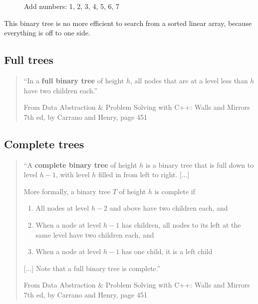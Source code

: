 \documentclass[a4paper,12pt,oneside]{book}
\begin{document}
{    \begin{figure}[h]
        \begin{center}
        \end{center}
        \caption{Add numbers: 1, 2, 3, 4, 5, 6, 7}
    \end{figure}

    This binary tree is no more efficient to search from a sorted linear array,
    because everything is off to one side.

    \subsection{Full trees}

    \begin{quote}
        ``In a \textbf{full binary tree} of height $h$, all nodes that are at a level less than $h$
        have two children each.''
        
        \footnotesize
        From Data Abstraction \& Problem Solving with C++: Walls and Mirrors 7th ed, by Carrano and Henry, page 451
    \end{quote}
    
    
    \subsection{Complete trees}
    
    \begin{quote}
        ``A \textbf{complete binary tree} of height $h$ is a binary tree that is full down to level $h-1$, with level $h$
        filled in from left to right. [...]

        More formally, a binary tree $T$ of height $h$ is complete if

        \begin{enumerate}
            \item   All nodes at level $h-2$ and above have two children each, and
            \item   When a node at level $h-1$ has children, all nodes to its left at the same level have two children each, and
            \item   When a node at level $h-1$ has one child, it is a left child
        \end{enumerate}

        [...] Note that a full binary tree is complete.''
        
        \footnotesize
        From Data Abstraction \& Problem Solving with C++: Walls and Mirrors 7th ed, by Carrano and Henry, page 451
    \end{quote}
    }{}
    
\end{document}
